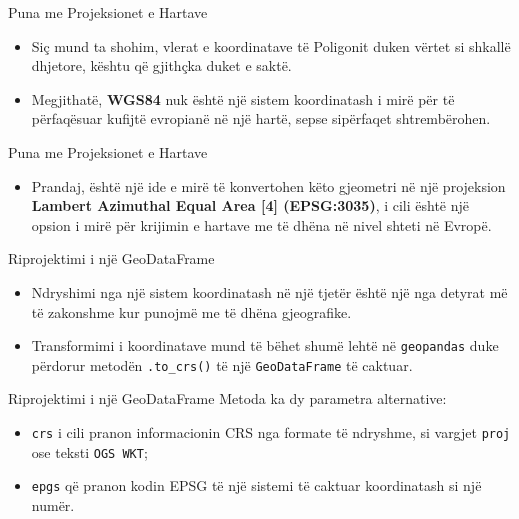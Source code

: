 \documentclass[
  ignorenonframetext,
]{beamer}
\providecommand{\tightlist}{%
  \setlength{\itemsep}{0pt}\setlength{\parskip}{0pt}}
\begin{document}
\begin{frame}{Puna me Projeksionet e Hartave}
\protect\hypertarget{puna-me-projeksionet-e-hartave-19}{}
\begin{itemize}
\item
  Siç mund ta shohim, vlerat e koordinatave të Poligonit duken vërtet si
  shkallë dhjetore, kështu që gjithçka duket e saktë.
\item
  Megjithatë, \textbf{WGS84} nuk është një sistem koordinatash i mirë
  për të përfaqësuar kufijtë evropianë në një hartë, sepse sipërfaqet
  shtrembërohen.
\end{itemize}
\end{frame}

\begin{frame}{Puna me Projeksionet e Hartave}
\protect\hypertarget{puna-me-projeksionet-e-hartave-20}{}
\begin{itemize}
\tightlist
\item
  Prandaj, është një ide e mirë të konvertohen këto gjeometri në një
  projeksion \textbf{Lambert Azimuthal Equal Area {[}4{]} (EPSG:3035)},
  i cili është një opsion i mirë për krijimin e hartave me të dhëna në
  nivel shteti në Evropë.
\end{itemize}
\end{frame}

\begin{frame}[fragile]{Riprojektimi i një GeoDataFrame}
\protect\hypertarget{riprojektimi-i-njuxeb-geodataframe}{}
\begin{itemize}
\item
  Ndryshimi nga një sistem koordinatash në një tjetër është një nga
  detyrat më të zakonshme kur punojmë me të dhëna gjeografike.
\item
  Transformimi i koordinatave mund të bëhet shumë lehtë në
  \texttt{geopandas} duke përdorur metodën \texttt{.to\_crs()} të një
  \texttt{GeoDataFrame} të caktuar.
\end{itemize}
\end{frame}

\begin{frame}[fragile]{Riprojektimi i një GeoDataFrame}
\protect\hypertarget{riprojektimi-i-njuxeb-geodataframe-1}{}
Metoda ka dy parametra alternative:

\begin{itemize}
\item
  \texttt{crs} i cili pranon informacionin CRS nga formate të ndryshme,
  si vargjet \texttt{proj} ose teksti \texttt{OGS\ WKT};
\item
  \texttt{epgs} që pranon kodin EPSG të një sistemi të caktuar
  koordinatash si një numër.
\end{itemize}
\end{frame}
\end{document}
